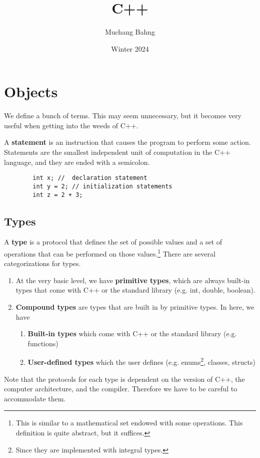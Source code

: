 \documentclass{article}
\begin{document}
\title{C++}
\author{Muchang Bahng}
\date{Winter 2024}

\maketitle
\tableofcontents
\pagebreak

\section{Objects}

    We define a bunch of terms. This may seem unnecessary, but it becomes very useful when getting into the weeds of C++. 

    \begin{definition}[Statements]
      A \textbf{statement} is an instruction that causes the program to perform some action. Statements are the smallest independent unit of computation in the C++ language, and they are ended with a semicolon. 
      \begin{lstlisting}
        int x; //  declaration statement 
        int y = 2; // initialization statements  
        int z = 2 + 3;
      \end{lstlisting}
    \end{definition}

  \subsection{Types}

    \begin{definition}[Type]
      A \textbf{type} is a protocol that defines the set of possible values and a set of operations that can be performed on those values.\footnote{This is similar to a mathematical set endowed with some operations. This definition is quite abstract, but it suffices.} There are several categorizations for types. 
      \begin{enumerate}
        \item At the very basic level, we have \textbf{primitive types}, which are always built-in types that come with C++ or the standard library (e.g. int, double, boolean). 
        \item \textbf{Compound types} are types that are built in by primitive types. In here, we have 
          \begin{enumerate}
            \item \textbf{Built-in types} which come with C++ or the standard library (e.g. functions) 
            \item \textbf{User-defined types} which the user defines (e.g. enums\footnote{Since they are implemented with integral types.}, classes, structs)
          \end{enumerate}
      \end{enumerate}
      Note that the protocols for each type is dependent on the version of C++, the computer architecture, and the compiler. Therefore we have to be careful to accommodate them. 
    \end{definition}
\end{document}
